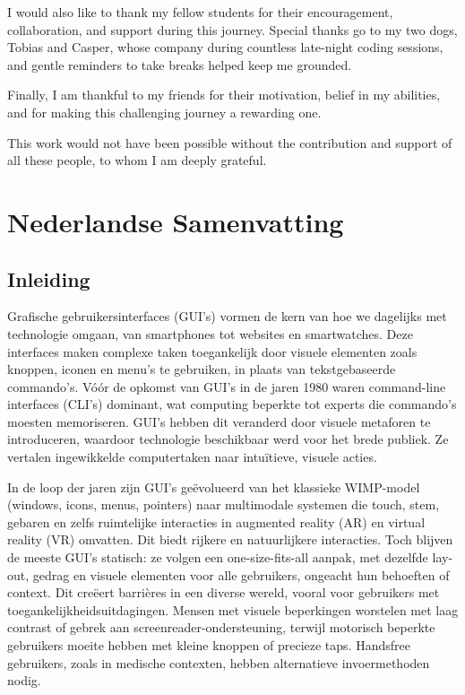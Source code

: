 \documentclass[openany]{book}
\begin{document}
I would also like to thank my fellow students for their encouragement, collaboration, and support during this journey. Special thanks go to my two dogs, Tobias and Casper, whose company during countless late-night coding sessions, and gentle reminders to take breaks helped keep me grounded.

Finally, I am thankful to my friends for their motivation, belief in my abilities, and for making this challenging journey a rewarding one.

This work would not have been possible without the contribution and support of all these people, to whom I am deeply grateful.

\chapter*{Nederlandse Samenvatting}
\section*{Inleiding}
Grafische gebruikersinterfaces (GUI's) vormen de kern van hoe we dagelijks met technologie omgaan, van smartphones tot websites en smartwatches. Deze interfaces maken complexe taken toegankelijk door visuele elementen zoals knoppen, iconen en menu's te gebruiken, in plaats van tekstgebaseerde commando's. Vóór de opkomst van GUI's in de jaren 1980 waren command-line interfaces (CLI's) dominant, wat computing beperkte tot experts die commando's moesten memoriseren. GUI's hebben dit veranderd door visuele metaforen te introduceren, waardoor technologie beschikbaar werd voor het brede publiek. Ze vertalen ingewikkelde computertaken naar intuïtieve, visuele acties.

In de loop der jaren zijn GUI's geëvolueerd van het klassieke WIMP-model (windows, icons, menus, pointers) naar multimodale systemen die touch, stem, gebaren en zelfs ruimtelijke interacties in augmented reality (AR) en virtual reality (VR) omvatten. Dit biedt rijkere en natuurlijkere interacties. Toch blijven de meeste GUI's statisch: ze volgen een one-size-fits-all aanpak, met dezelfde lay-out, gedrag en visuele elementen voor alle gebruikers, ongeacht hun behoeften of context. Dit creëert barrières in een diverse wereld, vooral voor gebruikers met toegankelijkheidsuitdagingen. Mensen met visuele beperkingen worstelen met laag contrast of gebrek aan screenreader-ondersteuning, terwijl motorisch beperkte gebruikers moeite hebben met kleine knoppen of precieze taps. Handsfree gebruikers, zoals in medische contexten, hebben alternatieve invoermethoden nodig.
\end{document}

